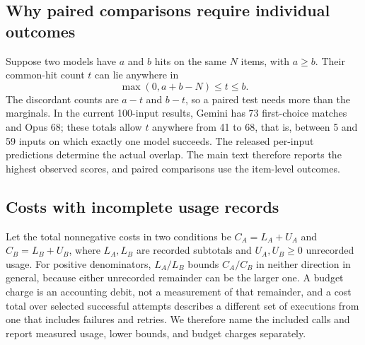 \subsection{Why paired comparisons require individual outcomes}
Suppose two models have $a$ and $b$ hits on the same $N$ items, with $a\ge b$. Their common-hit count $t$ can lie anywhere in
\[
\max(0,a+b-N)\le t\le b.
\]
The discordant counts are $a-t$ and $b-t$, so a paired test needs more than the marginals. In the current 100-input results, Gemini has 73 first-choice matches and Opus 68; these totals allow $t$ anywhere from 41 to 68, that is, between 5 and 59 inputs on which exactly one model succeeds. The released per-input predictions determine the actual overlap. The main text therefore reports the highest observed scores, and paired comparisons use the item-level outcomes.

\subsection{Costs with incomplete usage records}
Let the total nonnegative costs in two conditions be $C_A=L_A+U_A$ and $C_B=L_B+U_B$, where $L_A,L_B$ are recorded subtotals and $U_A,U_B\ge0$ unrecorded usage. For positive denominators, $L_A/L_B$ bounds $C_A/C_B$ in neither direction in general, because either unrecorded remainder can be the larger one. A budget charge is an accounting debit, not a measurement of that remainder, and a cost total over selected successful attempts describes a different set of executions from one that includes failures and retries. We therefore name the included calls and report measured usage, lower bounds, and budget charges separately.
